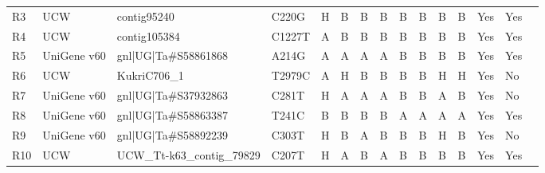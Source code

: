 \begin{sidewaystable}
\begin{localsize}{6}{9}
\begin{tabular}{llllllll|lllllll}
 R3         & UCW         & contig95240                                                     & C220G  & H      & B         & B        & B        & B            & B         & B         & B     & Yes           & Yes                    &                         \\
 R4         & UCW         & contig105384                                                    & C1227T & A      & B         & B        & B        & B            & B         & B         & B     & Yes           & Yes                    &                         \\
 R5         & UniGene v60 & gnl|UG|Ta\#S58861868                                             & A214G  & A      & A         & A        & A        & B            & B         & B         & B     & Yes           & Yes                    &                         \\
 \midrule
 R6         & UCW         & KukriC706\_1                                                     & T2979C & A      & H         & B        & B        & B            & B         & H         & H     & Yes           & No                     &                         \\
 R7         & UniGene v60 & gnl|UG|Ta\#S37932863                                             & C281T  & H      & A         & A        & A        & B            & B         & A         & B     & Yes           & No                     &                         \\
 R8         & UniGene v60 & gnl|UG|Ta\#S58863387                                             & T241C  & B      & B         & B        & B        & A            & A         & A         & A     & Yes           & Yes                    &                         \\
 \midrule
 R9         & UniGene v60 & gnl|UG|Ta\#S58892239                                             & C303T  & H      & B         & A        & B        & B            & B         & H         & B     & Yes           & No                     &                         \\
 R10        & UCW         & UCW\_Tt-k63\_contig\_79829                                         & C207T  & H      & A         & B        & A        & B            & B         & B         & B     & Yes           & Yes                    &                         \\


\end{tabular}
\end{localsize}
\end{sidewaystable}
